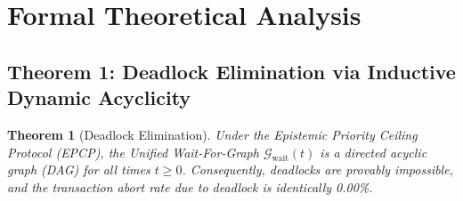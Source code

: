 \documentclass[conference,10pt]{IEEEtran}
\newtheorem{theorem}{Theorem}
\begin{document}
\section{Formal Theoretical Analysis}

\subsection{Theorem 1: Deadlock Elimination via Inductive Dynamic Acyclicity}
\begin{theorem}[Deadlock Elimination]
Under the Epistemic Priority Ceiling Protocol (EPCP), the Unified Wait-For-Graph $\mathcal{G}_{\text{wait}}(t)$ is a directed acyclic graph (DAG) for all times $t \ge 0$. Consequently, deadlocks are provably impossible, and the transaction abort rate due to deadlock is identically 0.00\%.
\end{theorem}
\end{document}

